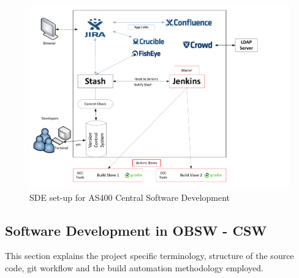 \documentclass[12pt, a4paper, titlepage]{scrartcl}
\begin{document}
\begin{figure}[!ht]
\centering
\caption{SDE set-up for AS400 Central Software Development}
\label{fig:sde-chart}
\includegraphics[width=\textwidth]{SDE-Chart.pdf}
\end{figure}

\subsection{Software Development in OBSW - CSW}
This section explains the project specific terminology, structure of the source code, git workflow and the build automation methodology employed.
\end{document}
